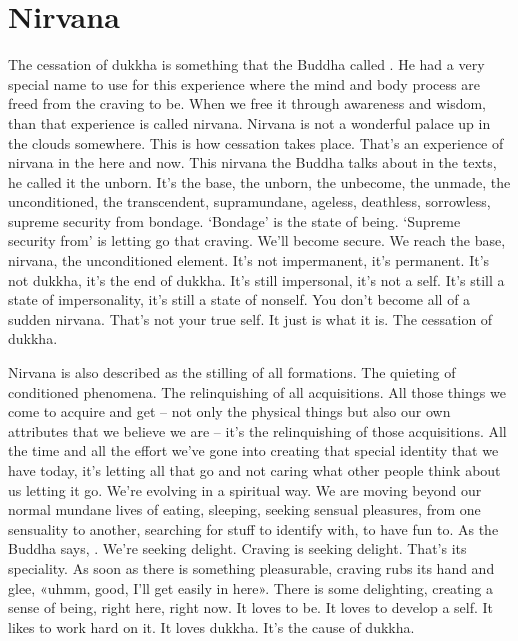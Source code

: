 \documentclass[letterpaper,10pt,english]{sphinxmanual}
\begin{document}
\section{Nirvana}
\label{\detokenize{6-b:nirvana}}
\sphinxAtStartPar
{} The cessation of dukkha is something that the Buddha called
.
He had a very special name to use for this experience where the mind and
body  process  are  freed  from  the  craving  to  be.  When  we  free  it  through
awareness  and  wisdom,  than  that  experience  is  called  nirvana.  Nirvana  is
not a wonderful palace up in the clouds somewhere.
This is how
cessation takes place. That’s an experience of nirvana in the here and now.
This  nirvana  the  Buddha  talks  about  in  the  texts,  he  called  it  the  unborn.
It’s the base, the unborn, the unbecome, the unmade, the unconditioned, the
transcendent, supra\sphinxhyphen{}mundane, ageless, deathless, sorrowless, supreme security from bondage. ‘Bondage’ is the state of being. ‘Supreme security from’
is letting go that craving. We’ll become secure. We reach the base, nirvana,
the  unconditioned  element.  It’s  not  impermanent,  it’s  permanent.  It’s  not
dukkha, it’s the end of dukkha. It’s still impersonal, it’s not a self. It’s still a
state of impersonality, it’s still a state of non\sphinxhyphen{}self. You don’t become all of a
sudden nirvana. That’s not your true self. It just is what it is. The cessation
of dukkha.

\sphinxAtStartPar
Nirvana is also described as the stilling of all formations. The quieting
of conditioned phenomena. The relinquishing of all acquisitions. All those
things we come to acquire and get – not only the physical things but also
our own attributes that we believe we are – it’s the relinquishing of those
acquisitions. All  the  time  and  all  the  effort  we’ve  gone  into  creating  that
special identity that we have today, it’s letting all that go and not caring what
other people think about us letting it go. We’re evolving in a spiritual way.
We are moving beyond our normal mundane lives of eating, sleeping, seeking sensual pleasures, from one sensuality to another, searching for stuff to
identify with, to have fun to. As the Buddha says,
. We’re seeking delight. Craving is seeking delight. That’s its speciality. As soon as there
is something pleasurable, craving rubs its hand and glee, «uhmm, good, I’ll
get easily in here». There is some delighting, creating a sense of being, right
here, right now. It loves to be. It loves to develop a self. It likes to work hard
on it. It loves dukkha. It’s the cause of dukkha.
\end{document}
